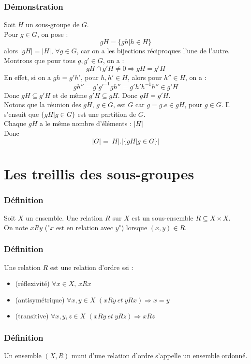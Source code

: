\documentclass[a4paper, oneside]{report}
\newcommand{\x}{\times}
\begin{document}
\subsubsection{Démonstration}
Soit $H$ un sous-groupe de $G$.\\
Pour $g\in G$, on pose :
$$gH=\{gh | h\in H \}$$
alors $|gH|=|H|$, $\forall g\in G$, car on a les bijections réciproques l'une de l'autre.\\
Montrons que pour tous $g,g'\in G$, on a :
$$gH\cap g'H \neq 0 \Rightarrow gH=g'H$$
En effet, si on a $gh=g'h'$, pour $h,h'\in H$, alors pour $h''\in H$, on a :
$$gh''=g'g'^{-1}gh''=g'h'h^{-1}h'' \in g'H$$
Donc $gH\subseteq g'H$ et de même $g'H \subseteq gH$. Donc $gH=g'H$.\\
Notons que la réunion des $gH$, $g\in G$, est $G$ car $g=g.e \in gH$, pour $g\in G$. Il s'ensuit que $\{gH| g\in G \}$ est une partition de $G$.\\
Chaque $gH$ a le même nombre d'éléments : $|H|$\\
Donc 
$$|G| = |H|.|\{gH | g\in G \}|$$

\section{Les treillis des sous-groupes}

\subsubsection{Définition}
Soit $X$ un ensemble. Une relation $R$ sur $X$ est un sous-ensemble $R\subseteq X\x X$.\\
On note $xRy$ ("$x$ est en relation avec $y$") lorsque $(x,y)\in R$.\\

\subsubsection{Définition}
Une relation $R$ est une relation d'ordre ssi :
\begin{itemize}
\item (réflexivité) $\forall x \in X$, $xRx$
\item (antisymétrique) $\forall x,y\in X$ $(xRy~et~yRx)\Rightarrow x=y$
\item (transitive) $\forall x,y,z\in X$ $(xRy~et~yRz) \Rightarrow xRz$
\end{itemize}

\subsubsection{Définition}
Un ensemble $(X,R)$ muni d'une relation d'ordre s'appelle un ensemble ordonné.
\end{document}
